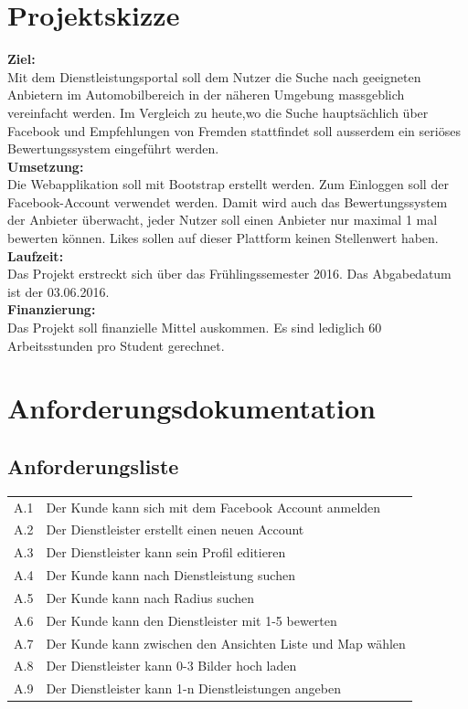 \documentclass[11pt,a4paper]{scrreprt}
\begin{document}
\chapter{Projektskizze}
\textbf{Ziel:}\\
Mit dem Dienstleistungsportal soll dem Nutzer die Suche nach geeigneten Anbietern im Automobilbereich in der näheren Umgebung massgeblich vereinfacht werden. Im Vergleich zu heute,wo die Suche hauptsächlich über Facebook und Empfehlungen von Fremden stattfindet soll ausserdem ein seriöses Bewertungssystem eingeführt werden.\\

\noindent
\textbf{Umsetzung:}\\
Die Webapplikation soll mit Bootstrap erstellt werden. Zum Einloggen soll der Facebook-Account verwendet werden. Damit wird auch das Bewertungssystem der Anbieter überwacht, jeder Nutzer soll einen Anbieter nur maximal 1 mal bewerten können. Likes sollen auf dieser Plattform keinen Stellenwert haben.\\

\noindent
\textbf{Laufzeit:}\\
Das Projekt erstreckt sich über das Frühlingssemester 2016. Das Abgabedatum ist der 03.06.2016.\\

\noindent
\textbf{Finanzierung:}\\
Das Projekt soll finanzielle Mittel auskommen. Es sind lediglich 60 Arbeitsstunden pro Student gerechnet.

\chapter{Anforderungsdokumentation}
\section{Anforderungsliste}
\begin{tabular}{ll}
    A.1 & Der Kunde kann sich mit dem Facebook Account anmelden\\
    A.2 & Der Dienstleister erstellt einen neuen Account\\
    A.3 & Der Dienstleister kann sein Profil editieren\\
    A.4 & Der Kunde kann nach Dienstleistung suchen\\
    A.5 & Der Kunde kann nach Radius suchen\\
    A.6 & Der Kunde kann den Dienstleister mit 1-5 bewerten\\
    A.7 & Der Kunde kann zwischen den Ansichten Liste und Map wählen\\
    A.8 & Der Dienstleister kann 0-3 Bilder hoch laden\\
    A.9 & Der Dienstleister kann 1-n Dienstleistungen angeben\\

\end{tabular}\\
\end{document}
